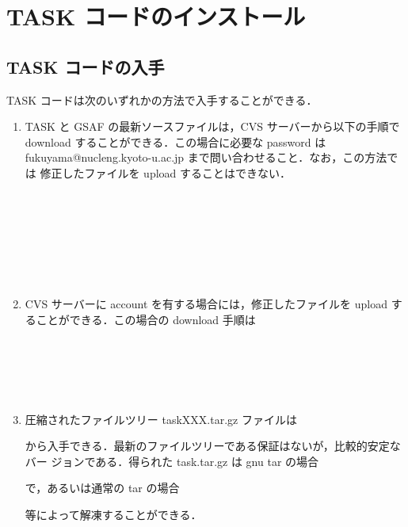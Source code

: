 \documentclass[11pt]{jarticle}
\begin{document}
\section{TASK コードのインストール}

\subsection{TASK コードの入手}

TASK コードは次のいずれかの方法で入手することができる．
\begin{enumerate}
\item
TASK と GSAF の最新ソースファイルは，CVS サーバーから以下の手順で
download することができる．この場合に必要な password は
fukuyama@nucleng.kyoto-u.ac.jp まで問い合わせること．なお，この方法では
修正したファイルを upload することはできない．

 \\
 \\
 \\
 \\
 \\
 \\

\item
CVS サーバーに account を有する場合には，修正したファイルを upload す
ることができる．この場合の download 手順は

 \\
 \\
 \\
 \\

\item
圧縮されたファイルツリー taskXXX.tar.gz ファイルは


から入手できる．最新のファイルツリーである保証はないが，比較的安定なバー
ジョンである．得られた task.tar.gz は gnu tar の場合


で，あるいは通常の tar の場合


等によって解凍することができる．
\end{enumerate}
\end{document}
